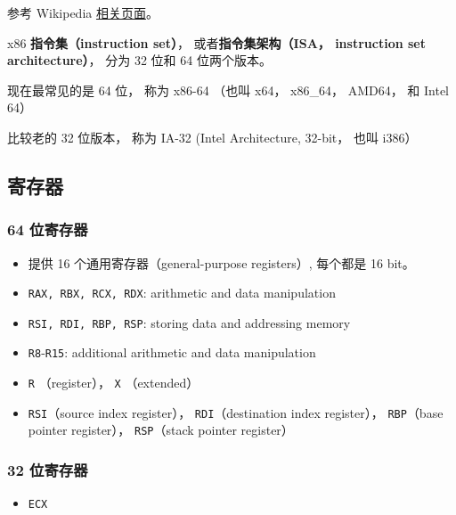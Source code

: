 
\begin{issues}
\issueDraft
\end{issues}

参考 Wikipedia \href{https://en.wikipedia.org/wiki/X86-64}{相关页面}。

x86 \textbf{指令集（instruction set）}， 或者\textbf{指令集架构（ISA， instruction set architecture）}， 分为 32 位和 64 位两个版本。

现在最常见的是 64 位， 称为 x86-64 （也叫 x64， x86_64， AMD64， 和 Intel 64）

比较老的 32 位版本， 称为 IA-32 (Intel Architecture, 32-bit， 也叫 i386）


\subsection{寄存器}
\subsubsection{64 位寄存器}
\begin{itemize}
\item 提供 16 个通用寄存器（general-purpose registers）, 每个都是 16 bit。
\item \verb|RAX, RBX, RCX, RDX|: arithmetic and data manipulation
\item \verb|RSI, RDI, RBP, RSP|: storing data and addressing memory
\item \verb|R8|-\verb|R15|: additional arithmetic and data manipulation
\item \verb|R| （register）， \verb|X| （extended）
\item \verb|RSI|（source index register）， \verb|RDI|（destination index register）， \verb|RBP|（base pointer register）， \verb|RSP|（stack pointer register）
\end{itemize}

\subsubsection{32 位寄存器}
\begin{itemize}
\item \verb|ECX|
\end{itemize}
